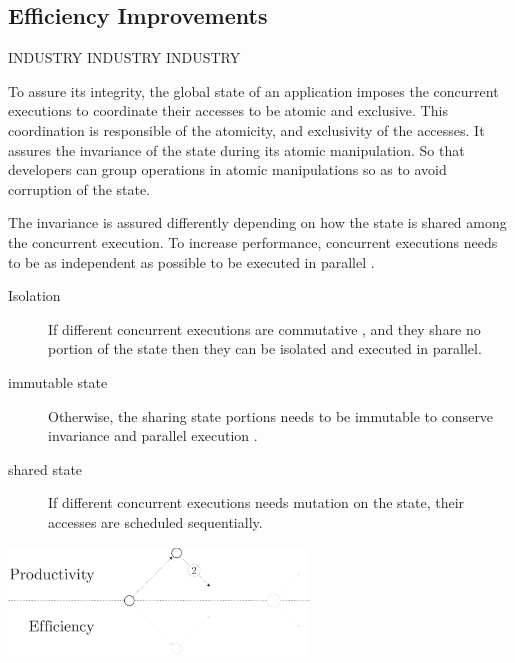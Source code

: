 \subsection{Efficiency Improvements} \label{chapter3:software-maintainability:performance}

INDUSTRY INDUSTRY INDUSTRY

To assure its integrity, the global state of an application imposes the concurrent executions to coordinate their accesses to be atomic and exclusive.
This coordination is responsible of the atomicity, and exclusivity of the accesses.
It assures the invariance of the state during its atomic manipulation.
So that developers can group operations in atomic manipulations so as to avoid corruption of the state.

The invariance is assured differently depending on how the state is shared among the concurrent execution.
To increase performance, concurrent executions needs to be as independent as possible to be executed in parallel .
\begin{description}
  \item[Isolation] If different concurrent executions are commutative \cite{Rinard1996,Clements2013a}, and they share no portion of the state then they can be isolated and executed in parallel.
  \item[immutable state] Otherwise, the sharing state portions needs to be immutable to conserve invariance and parallel execution \cite{Gordon2012,Matsakis2012a}.
  \item[shared state] If different concurrent executions needs mutation on the state, their accesses are scheduled sequentially.
\end{description}

\begin{center}
\includegraphics[width=0.6\textwidth]{../resources/state-of-the-art-2.pdf}
\end{center}

